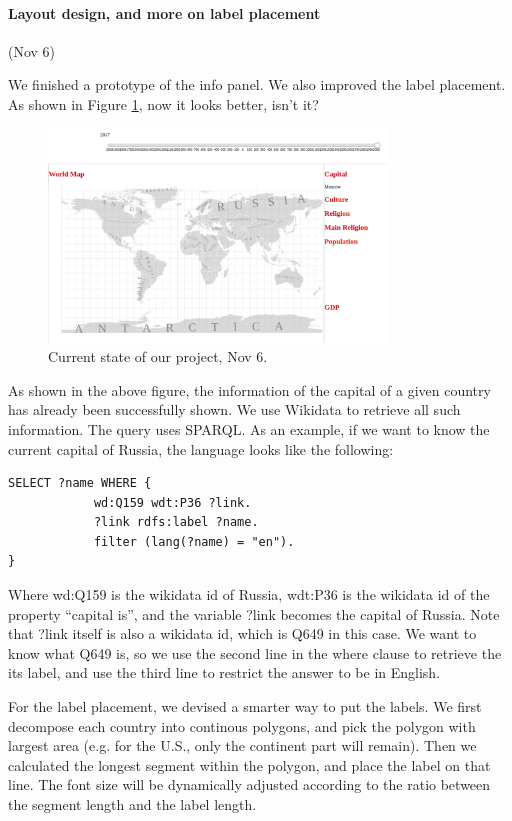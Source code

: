 \documentclass[12pt, fullpage,letterpaper]{article}
\begin{document}
\paragraph{Layout design, and more on label placement} (Nov 6)

We finished a prototype of the info panel. We also improved the label placement.
As shown in Figure \ref{fig:nov6}, now it looks better, isn't it?

\begin{figure}[h!]
    \begin{center}
        \includegraphics[width=0.8\textwidth]{figs/Nov6.png}
        \caption{Current state of our project, Nov 6.}
        \label{fig:nov6}
    \end{center}
\end{figure}

As shown in the above figure, the information of the capital of a given country
has already been successfully shown. We use Wikidata to retrieve all such information.
The query uses SPARQL. As an example, if we want to know the current capital of Russia,
the language looks like the following:

\begin{verbatim}
SELECT ?name WHERE {
            wd:Q159 wdt:P36 ?link.
            ?link rdfs:label ?name.
            filter (lang(?name) = "en").
}
\end{verbatim}

Where wd:Q159 is the wikidata id of Russia, wdt:P36 is the wikidata id of the property ``capital is'',
and the variable ?link becomes the capital of Russia. Note that ?link itself is also a wikidata id,
which is Q649 in this case. We want to know what Q649 is, so we use the second line in the where clause to retrieve
the its label, and use the third line to restrict the answer to be in English.

For the label placement, we devised a smarter way to put the labels. We first decompose
each country into continous polygons, and pick the polygon with largest area (e.g. for the U.S., only the continent part will remain).
Then we calculated the longest segment within the polygon, and place the label on that line.
The font size will be dynamically adjusted according to the ratio between the segment length and the label length.
\end{document}
